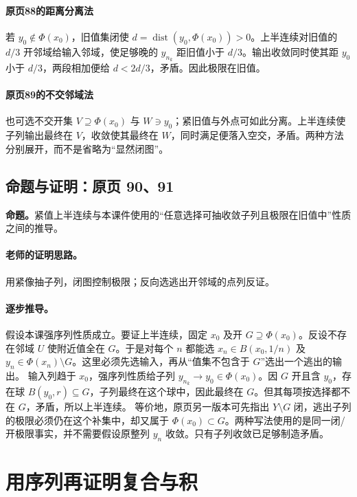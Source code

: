 \paragraph{原页88的距离分离法}
若 $y_0\notin\Phi(x_0)$，旧值集闭使 $d=\operatorname{dist}(y_0,\Phi(x_0))>0$。上半连续对旧值的 $d/3$ 开邻域给输入邻域，使足够晚的 $y_{n_k}$ 距旧值小于 $d/3$。输出收敛同时使其距 $y_0$ 小于 $d/3$，两段相加便给 $d<2d/3$，矛盾。因此极限在旧值。
\paragraph{原页89的不交邻域法}
也可选不交开集 $V\supseteq\Phi(x_0)$ 与 $W\ni y_0$；紧旧值与外点可如此分离。上半连续使子列输出最终在 $V$，收敛使其最终在 $W$，同时满足便落入空交，矛盾。两种方法分别展开，而不是省略为“显然闭图”。


\subsection{命题与证明：原页 90、91}

\textbf{命题。}紧值上半连续与本课件使用的“任意选择可抽收敛子列且极限在旧值中”性质之间的推导。

\paragraph{老师的证明思路。}用紧像抽子列，闭图控制极限；反向选逃出开邻域的点列反证。

\paragraph{逐步推导。}
假设本课强序列性质成立。要证上半连续，固定 $x_0$ 及开 $G\supseteq\Phi(x_0)$。反设不存在邻域 $U$ 使附近值全在 $G$。于是对每个 $n$ 都能选 $x_n\in B(x_0,1/n)$ 及 $y_n\in\Phi(x_n)\setminus G$。这里必须先选输入，再从“值集不包含于 $G$”选出一个逃出的输出。
输入列趋于 $x_0$，强序列性质给子列 $y_{n_k}\to y_0\in\Phi(x_0)$。因 $G$ 开且含 $y_0$，存在球 $B(y_0,r)\subseteq G$，子列最终在这个球中，因此最终在 $G$。但其每项按选择都不在 $G$，矛盾，所以上半连续。
等价地，原页另一版本可先指出 $Y\setminus G$ 闭，逃出子列的极限必须仍在这个补集中，却又属于 $\Phi(x_0)\subset G$。两种写法使用的是同一闭/开极限事实，并不需要假设原整列 $y_n$ 收敛。只有子列收敛已足够制造矛盾。


\clearpage\section{用序列再证明复合与积}\label{g:108:92}

